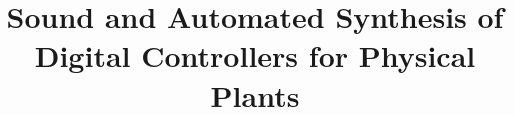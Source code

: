 \documentclass{sig-alternate-05-2015}
\begin{document}

\doi{}

\isbn{}

%

\title{
Sound and Automated Synthesis of Digital Controllers for Physical Plants 
}
%
%
%
%
%
\end{document}
